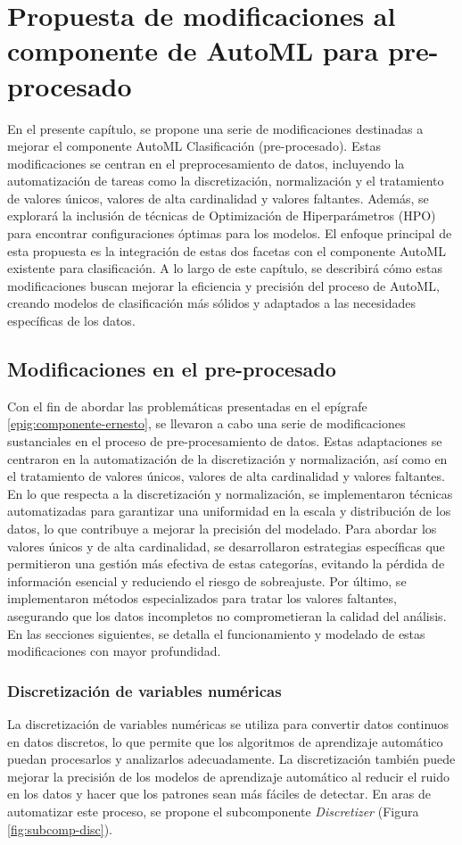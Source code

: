 \chapter{Propuesta de modificaciones al componente de AutoML para pre-procesado}\label{chap:2}
En el presente capítulo, se propone una serie de modificaciones destinadas a mejorar el componente AutoML Clasificación (pre-procesado). Estas modificaciones se centran en el preprocesamiento de datos, incluyendo la automatización de tareas como la discretización, normalización y el tratamiento de valores únicos, valores de alta cardinalidad y valores faltantes. Además, se explorará la inclusión de técnicas de Optimización de Hiperparámetros (HPO) para encontrar configuraciones óptimas para los modelos. El enfoque principal de esta propuesta es la integración de estas dos facetas con el componente AutoML existente para clasificación. A lo largo de este capítulo, se describirá cómo estas modificaciones buscan mejorar la eficiencia y precisión del proceso de AutoML, creando modelos de clasificación más sólidos y adaptados a las necesidades específicas de los datos.

\section{Modificaciones en el pre-procesado}
Con el fin de abordar las problemáticas presentadas en el epígrafe \ref{epig:componente-ernesto}, se llevaron a cabo una serie de modificaciones sustanciales en el proceso de pre-procesamiento de datos. Estas adaptaciones se centraron en la automatización de la discretización y normalización, así como en el tratamiento de valores únicos, valores de alta cardinalidad y valores faltantes. En lo que respecta a la discretización y normalización, se implementaron técnicas automatizadas para garantizar una uniformidad en la escala y distribución de los datos, lo que contribuye a mejorar la precisión del modelado. Para abordar los valores únicos y de alta cardinalidad, se desarrollaron estrategias específicas que permitieron una gestión más efectiva de estas categorías, evitando la pérdida de información esencial y reduciendo el riesgo de sobreajuste. Por último, se implementaron métodos especializados para tratar los valores faltantes, asegurando que los datos incompletos no comprometieran la calidad del análisis. En las secciones siguientes, se detalla el funcionamiento y modelado de estas modificaciones con mayor profundidad.


\subsection{Discretización de variables numéricas} 
La discretización de variables numéricas se utiliza para convertir datos continuos en datos discretos, lo que permite que los algoritmos de aprendizaje automático puedan procesarlos y analizarlos adecuadamente. La discretización también puede mejorar la precisión de los modelos de aprendizaje automático al reducir el ruido en los datos y hacer que los patrones sean más fáciles de detectar. En aras de automatizar este proceso, se propone el subcomponente \textit{Discretizer} (Figura \ref{fig:subcomp-disc}).

